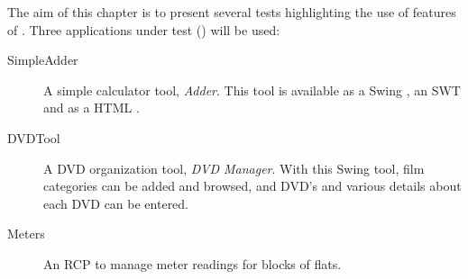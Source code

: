 
The aim of this chapter is to present several tests highlighting the use of  features of \app{}. Three applications under test (\gdauts) will be used:


\begin{description}
\item[SimpleAdder]{ A simple calculator tool, \emph{Adder}. This tool is available as a Swing \gdaut{}, an SWT \gdaut{} and as a HTML \gdaut{}. }
\item [DVDTool]{A DVD organization tool, \emph{DVD Manager}. With this Swing tool, film categories can be added and browsed, and DVD's and various details about each DVD can be entered.}  
\item [Meters]{An RCP \gdaut{} to manage meter readings for blocks of flats.}
\end{description}


